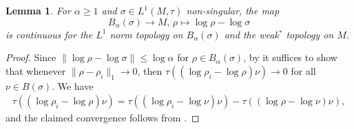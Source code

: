 \documentclass[12pt,a4paper]{amsart}
\newcommand{\1}{\mathds{1}}
\newcommand{\norm}[1]{\lVert#1\rVert}
\theoremstyle{plain}
\newtheorem{lemma}[proposition]{Lemma}
\theoremstyle{definition}
\theoremstyle{remark}
\begin{document}
\begin{lemma}\label{lem:rel_Hamiltonian_cont}
For $\alpha\geq 1$ and $\sigma\in L^1(M,\tau)$ non-singular, the map
\begin{equation*}
B_\alpha(\sigma)\to M,\,\rho\mapsto \log \rho-\log\sigma
\end{equation*}
is continuous for the $L^1$ norm topology on $B_\alpha(\sigma)$ and the weak$^\ast$ topology on $M$.
\end{lemma}
\begin{proof}
Since $\norm{\log\rho-\log\sigma}\leq \log \alpha$ for $\rho\in B_\alpha(\sigma)$, by  it suffices to show that whenever $\norm{\rho-\rho_i}_1\to 0$, then $\tau((\log\rho_i-\log \rho)\nu)\to 0$ for all $\nu\in B(\sigma)$. We have
\begin{align*}
\tau((\log\rho_i-\log\rho)\nu)=\tau((\log \rho_i-\log \nu)\nu)-\tau((\log\rho-\log\nu)\nu),
\end{align*}
and the claimed convergence follows from \cite[Theorem 3.7 (2)]{Ara78}.
\end{proof}
\end{document}
